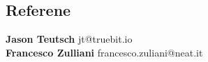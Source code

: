 \documentclass[8pt]{article}
\begin{document}
\begin{multicols}{2}
  \section*{Referene}
  {\bf Jason Teutsch} jt@truebit.io\\[5pt]
  {\bf Francesco Zulliani} francesco.zuliani@neat.it\\[5pt]

\end{multicols}
\end{document}
